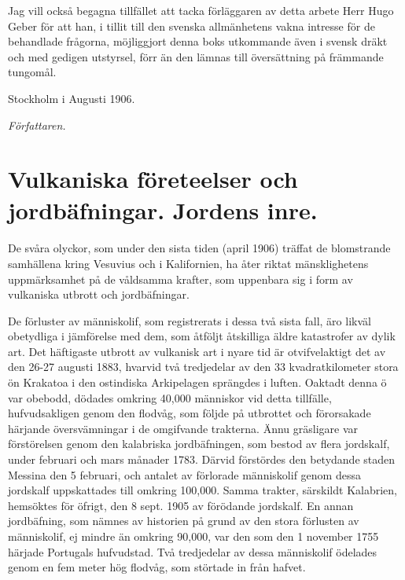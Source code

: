 \documentclass[a4paper, 12pt, oneside, swedish]{article}
\begin{document}
Jag vill också begagna tillfället att tacka förläggaren av detta arbete Herr Hugo Geber för att han, i tillit till den svenska allmänhetens vakna intresse för de behandlade frågorna, möjliggjort denna boks utkommande även i svensk dräkt och med gedigen utstyrsel, förr än den lämnas till översättning på främmande tungomål.

Stockholm i Augusti 1906.

\begin{flushright}
\emph{Författaren.}
\end{flushright}
\clearpage
\section{Vulkaniska företeelser och jordbäfningar. Jordens inre.}
\paragraph{}
De svåra olyckor, som under den sista tiden (april 1906) träffat de blomstrande samhällena kring Vesuvius och i Kalifornien, ha åter riktat mänsklighetens uppmärksamhet på de våldsamma krafter, som uppenbara sig i form av vulkaniska utbrott och jordbäfningar.

De förluster av människolif, som registrerats i dessa två sista fall, äro likväl obetydliga i jämförelse med dem, som åtföljt åtskilliga äldre katastrofer av dylik art. Det häftigaste utbrott av vulkanisk art i nyare tid är otvifvelaktigt det av den 26-27 augusti 1883, hvarvid två tredjedelar av den 33 kvadratkilometer stora ön Krakatoa i den ostindiska Arkipelagen sprängdes i luften. Oaktadt denna ö var obebodd, dödades omkring 40,000 människor vid detta tillfälle, hufvudsakligen genom den flodvåg, som följde på utbrottet och förorsakade härjande översvämningar i de omgifvande trakterna. Ännu gräsligare var förstörelsen genom den kalabriska jordbäfningen, som bestod av flera jordskalf, under februari och mars månader 1783. Därvid förstördes den betydande staden Messina den 5 februari, och antalet av förlorade människolif genom dessa jordskalf uppskattades till omkring 100,000. Samma trakter, särskildt Kalabrien, hemsöktes för öfrigt, den 8 sept. 1905 av förödande jordskalf. En annan jordbäfning, som nämnes av historien på grund av den stora förlusten av människolif, ej mindre än omkring 90,000, var den som den 1 november 1755 härjade Portugals hufvudstad. Två tredjedelar av dessa människolif ödelades genom en fem meter hög flodvåg, som störtade in från hafvet.
\end{document}
